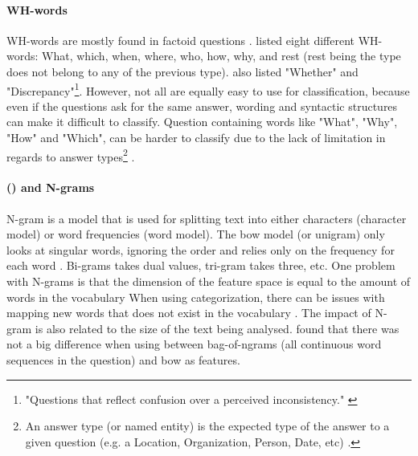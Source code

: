 \paragraph{WH-words}
\label{sec:wh_words}
WH-words are mostly found in factoid questions \cite{Lopez2011}. 
\textcite{Huang2008} listed eight different WH-words: What, which, when, where, who, how, why, and rest (rest being the type does not belong to any of the previous type). 
\textcite{Letovsky1987} also listed "Whether" and "Discrepancy"\footnote{
	"Questions that reflect confusion over a perceived inconsistency." \cite[p.~5]{Letovsky1987}
}.
However, not all are equally easy to use for classification, because even if the questions ask for the same answer, wording and syntactic structures can make it difficult to classify.
Question containing words like "What", "Why", "How" and "Which", can be harder to classify due to the lack of limitation in regards to answer types\footnote{
	An answer type (or named entity) is the expected type of the answer to a given question (e.g. a Location, Organization, Person, Date, etc) \cite{Heie2012, Lopez2011, Sasaki2005, Yen2013}. 
} \cite{Huang2008, Lopez2011}.


\paragraph[Bag-of-words and N-grams]{ () and N-grams}
\label{sec:bow}
N-gram is a model that is used for splitting text into either characters (character model) or word frequencies (word model). 
The \gls{bow} model (or unigram) only looks at singular words, ignoring the order and relies only on the frequency for each word \cite{Manning2008, Russell2013}. 
Bi-grams takes dual values, tri-gram takes three, etc.
\vspace{0.5em}\newline
One problem with N-grams is that the dimension of the feature space is equal to the amount of words in the vocabulary \cite{Russell2013, Loni2011}
When using categorization, there can be issues with mapping new words that does not exist in the vocabulary \cite{Yen2013}.
The impact of N-gram is also related to the size of the text being analysed. 
\textcite{Zhang2003} found that there was not a big difference when using between bag-of-ngrams (all continuous word sequences in the question) and \gls{bow} as features.



